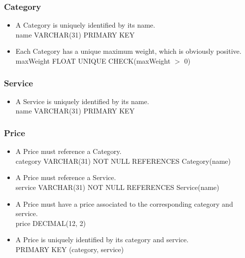 \documentclass{report}[a4paper]
\theoremstyle{remark}
\begin{document}
\subsubsection{Category}
\begin{itemize}
    \item A Category is uniquely identified by its name. \\ name VARCHAR(31) PRIMARY KEY
    \item Each Category has a unique maximum weight, which is obviously positive. \\ maxWeight FLOAT UNIQUE CHECK(maxWeight $>$ 0)
\end{itemize}
\subsubsection{Service}
\begin{itemize}
    \item A Service is uniquely identified by its name. \\ name VARCHAR(31) PRIMARY KEY
\end{itemize}
\subsubsection{Price}
\begin{itemize}
    \item A Price must reference a Category. \\ category VARCHAR(31) NOT NULL REFERENCES Category(name)
    \item A Price must reference a Service. \\ service VARCHAR(31) NOT NULL REFERENCES Service(name)
    \item A Price must have a price associated to the corresponding category and service. \\ price DECIMAL(12, 2)
    \item A Price is uniquely identified by its category and service. \\ PRIMARY KEY (category, service)
\end{itemize}
\end{document}
